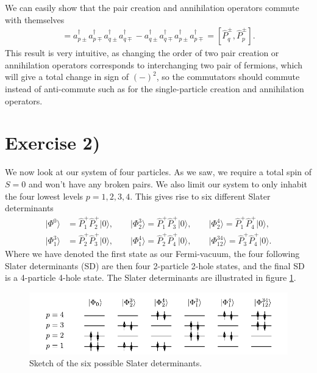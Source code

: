 \documentclass[a4paper, 11pt, notitlepage, english]{article}
\newcommand{\ket}[1]{|#1 \rangle}
\newcommand{\op}[1]{\hat{#1}}
\begin{document}
We can easily show that the pair creation and annihilation operators commute with themselves
\begin{align*}
[\op{P}^\pm_p, \op{P}^\pm_q] = a_{p\pm}^\dagger a_{p\mp}^\dagger a_{q\pm}^\dagger a_{q\mp}^\dagger - a_{q\pm}^\dagger a_{q\mp}^\dagger  a_{p\pm}^\dagger a_{p\mp}^\dagger = [\op{P}^\pm_q,\op{P}^\pm_p].
\end{align*}
This result is very intuitive, as changing the order of two pair creation or annihilation operators corresponds to interchanging two pair of fermions, which will give a total change in sign of $(-)^2$, so the commutators should commute instead of anti-commute such as for the single-particle creation and annihilation operators.

\clearpage

\section*{Exercise 2)}

We now look at our system of four particles. As we saw, we require a total spin of $S=0$ and won't have any broken pairs. We also limit our system to only inhabit the four lowest levels $p=1,2,3,4$.  This gives rise to six different Slater determinants
\begin{align*}
	\ket{\Phi^{0}} &= \op{P}_1^+ \op{P}_2^+ \ket{0}, \qquad \ket{\Phi_2^{3}} = \op{P}_1^+ \op{P}_3^+ \ket{0}, \qquad \ket{\Phi_2^{4}} = \op{P}_1^+ \op{P}_4^+ \ket{0}, \\
	\ket{\Phi_1^{3}} &= \op{P}_2^+ \op{P}_3^+ \ket{0}, \qquad \ket{\Phi_1^{4}} = \op{P}_2^+ \op{P}_4^+ \ket{0}, \qquad \ket{\Phi_{12}^{34}} = \op{P}_3^+ \op{P}_4^+ \ket{0}.
\end{align*}
Where we have denoted the first state as our Fermi-vacuum, the four following Slater determinants (SD) are then four 2-particle 2-hole states, and the final SD is a 4-particle 4-hole state. The Slater determinants are illustrated in figure \ref{fig:2}.

\begin{figure}[htpb]
	\includegraphics[width=\textwidth]{project2b.pdf}
	\caption{Sketch of the six possible Slater determinants. \label{fig:2}}
\end{figure}
\end{document}
